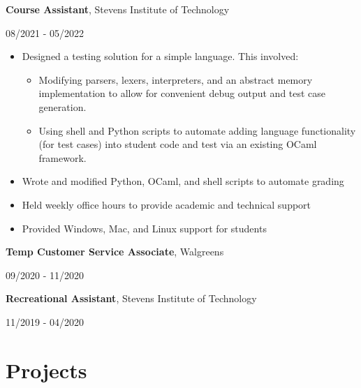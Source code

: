 \documentclass[10pt,letterpaper]{article}
\begin{document}
  \textbf{Course Assistant}, Stevens Institute of Technology\hfill
	\begin{minipage}[t]{1.2in}
		08/2021 - 05/2022
	\end{minipage}
	\begin{itemize}
		\item Designed a testing solution for a simple language. This involved:
      \begin{itemize}
        \item Modifying parsers, lexers, interpreters, and an abstract memory implementation to allow for convenient debug output and test case generation.
        \item Using shell and Python scripts to automate adding language functionality (for test cases) into student code and test via an existing OCaml framework.
      \end{itemize}
    \item Wrote and modified Python, OCaml, and shell scripts to automate grading
    \item Held weekly office hours to provide academic and technical support
    \item Provided Windows, Mac, and Linux support for students
	\end{itemize}

    \textbf{Temp Customer Service Associate}, Walgreens \hfill
    \begin{minipage}[t]{1.2in}
      09/2020 - 11/2020
    \end{minipage}

    \textbf{Recreational Assistant}, Stevens Institute of Technology\hfill
    \begin{minipage}[t]{1.2in}
      11/2019 - 04/2020
    \end{minipage}

  \section{Projects}
\end{document}
